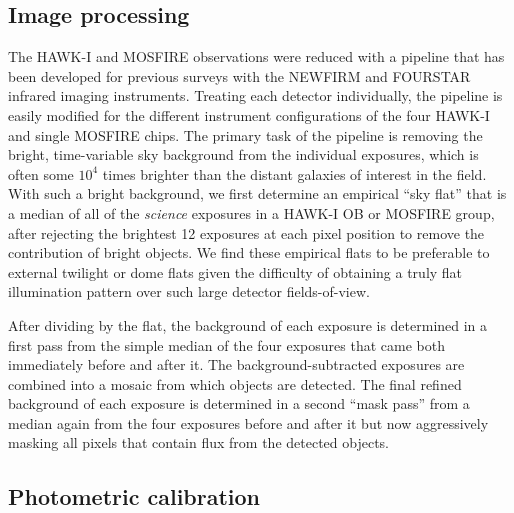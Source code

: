 \documentclass[iop, numberedappendix]{emulateapj}
\begin{document}
\subsection{Image processing}
\label{s:processing}

The HAWK-I and MOSFIRE observations were reduced with a pipeline that has been developed for previous surveys with the NEWFIRM \citep[NMBS;][]{whitaker:nmbs} and FOURSTAR \citep[zFOURGE;][, Labb\'e in prep]{spitler:12} infrared imaging instruments.  Treating each detector individually, the pipeline is easily modified for the different instrument configurations of the four HAWK-I and single MOSFIRE chips.  The primary task of the pipeline is removing the bright, time-variable sky background from the individual exposures, which is often some $10^4$ times brighter than the distant galaxies of interest in the field.  With such a bright background, we first determine an empirical ``sky flat'' that is a median of all of the \textit{science} exposures in a HAWK-I OB or MOSFIRE group, after rejecting the brightest 12 exposures at each pixel position to remove the contribution of bright objects.  We find these empirical flats to be preferable to external twilight or dome flats given the difficulty of obtaining a truly flat illumination pattern over such large detector fields-of-view.  

After dividing by the flat, the background of each exposure is determined in a first pass from the simple median of the four exposures that came both immediately before and after it.  The background-subtracted exposures are combined into a mosaic from which objects are detected.  The final refined background of each exposure is determined in a second ``mask pass'' from a median again from the four exposures before and after it but now aggressively masking all pixels that contain flux from the detected objects.

\subsection{Photometric calibration}
\label{s:calib}
\end{document}
